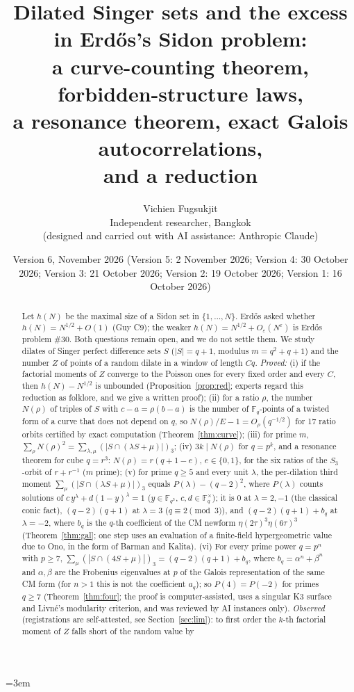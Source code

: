 \documentclass[11pt]{article}
\title{Dilated Singer sets and the excess in Erd\H{o}s's Sidon problem:\\ a curve-counting theorem, forbidden-structure laws,\\ a resonance theorem, exact Galois autocorrelations,\\ and a reduction}
\author{Vichien Fugsukjit\\ Independent researcher, Bangkok\\ \small(designed and carried out with AI assistance: Anthropic Claude)}
\date{Version 6, November 2026 (Version 5: 2 November 2026; Version 4: 30 October 2026; Version 3: 21 October 2026; Version 2: 19 October 2026; Version 1: 16 October 2026)}
\begin{document}
\emergencystretch=3em
\maketitle
\begin{abstract}
Let $h(N)$ be the maximal size of a Sidon set in $\{1,\dots,N\}$. Erd\H{o}s asked whether $h(N)=N^{1/2}+O(1)$ (Guy C9); the weaker
$h(N)=N^{1/2}+O_\varepsilon(N^\varepsilon)$ is Erd\H{o}s problem \#30. Both questions remain open, and we do not settle them. We study dilates of Singer perfect difference sets $S$
($|S|=q+1$, modulus $m=q^2+q+1$) and the number $Z$ of points of a random dilate in a window of length $Cq$.
\emph{Proved:} (i) if the factorial moments of $Z$ converge to the Poisson ones for every fixed order and every $C$, then $h(N)-N^{1/2}$ is unbounded
(Proposition~\ref{prop:red}; experts regard this reduction as folklore, and we give a written proof); (ii) for a ratio $\rho$, the number $N(\rho)$ of triples of $S$ with $c-a=\rho(b-a)$
is the number of $\mathbb F_q$-points of a twisted form of a curve that does not depend on $q$, so $N(\rho)/E-1=O_\rho(q^{-1/2})$ for 17 ratio orbits certified by exact computation (Theorem~\ref{thm:curve});
(iii) for prime $m$, $\sum_\rho N(\rho)^2=\sum_{\lambda,\mu}(|S\cap(\lambda S+\mu)|)_3$; (iv) $3k\mid N(\rho)$ for $q=p^k$, and a resonance theorem for cube $q=r^3$: $N(\rho)=r(q+1-e)$,
$e\in\{0,1\}$, for the six ratios of the $S_3$-orbit of $r+r^{-1}$ ($m$ prime); (v) for prime $q\ge5$ and every unit $\lambda$, the per-dilation third moment
$\sum_\mu(|S\cap(\lambda S+\mu)|)_3$ equals $P(\lambda)-(q-2)^2$, where $P(\lambda)$ counts solutions of $c\,y^\lambda+d(1-y)^\lambda=1$ ($y\in\mathbb F_{q^3}$, $c,d\in\mathbb F_q^\times$);
it is $0$ at $\lambda=2,-1$ (the classical conic fact), $(q-2)(q+1)$ at $\lambda=3$ ($q\equiv2\pmod3$), and $(q-2)(q+1)+b_q$ at $\lambda=-2$, where $b_q$ is the $q$-th
coefficient of the CM newform $\eta(2\tau)^3\eta(6\tau)^3$ (Theorem~\ref{thm:gal}; one step uses an evaluation of a finite-field hypergeometric value due to Ono, in the form of Barman and Kalita).
(vi) For every prime power $q=p^n$ with $p\ge7$, $\sum_\mu(|S\cap(4S+\mu)|)_3=(q-2)(q+1)+b_q$, where $b_q=\alpha^n+\beta^n$ and $\alpha,\beta$ are the Frobenius eigenvalues at $p$ of the Galois representation of the same CM form (for $n>1$ this is not the coefficient $a_q$); so $P(4)=P(-2)$ for primes $q\ge7$ (Theorem~\ref{thm:four}; the proof is computer-assisted, uses a singular K3 surface and Livn\'e's modularity criterion, and was reviewed by AI instances only).
\emph{Observed} (registrations are self-attested, see Section~\ref{sec:lim}): to first order the $k$-th factorial moment of $Z$ falls short of the random value by

\end{abstract}
\end{document}
